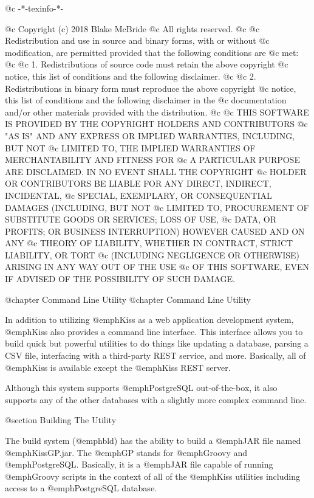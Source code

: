 @c -*-texinfo-*-

@c  Copyright (c) 2018 Blake McBride
@c  All rights reserved.
@c
@c  Redistribution and use in source and binary forms, with or without
@c  modification, are permitted provided that the following conditions are
@c  met:
@c
@c  1. Redistributions of source code must retain the above copyright
@c  notice, this list of conditions and the following disclaimer.
@c
@c  2. Redistributions in binary form must reproduce the above copyright
@c  notice, this list of conditions and the following disclaimer in the
@c  documentation and/or other materials provided with the distribution.
@c
@c  THIS SOFTWARE IS PROVIDED BY THE COPYRIGHT HOLDERS AND CONTRIBUTORS
@c  "AS IS" AND ANY EXPRESS OR IMPLIED WARRANTIES, INCLUDING, BUT NOT
@c  LIMITED TO, THE IMPLIED WARRANTIES OF MERCHANTABILITY AND FITNESS FOR
@c  A PARTICULAR PURPOSE ARE DISCLAIMED. IN NO EVENT SHALL THE COPYRIGHT
@c  HOLDER OR CONTRIBUTORS BE LIABLE FOR ANY DIRECT, INDIRECT, INCIDENTAL,
@c  SPECIAL, EXEMPLARY, OR CONSEQUENTIAL DAMAGES (INCLUDING, BUT NOT
@c  LIMITED TO, PROCUREMENT OF SUBSTITUTE GOODS OR SERVICES; LOSS OF USE,
@c  DATA, OR PROFITS; OR BUSINESS INTERRUPTION) HOWEVER CAUSED AND ON ANY
@c  THEORY OF LIABILITY, WHETHER IN CONTRACT, STRICT LIABILITY, OR TORT
@c  (INCLUDING NEGLIGENCE OR OTHERWISE) ARISING IN ANY WAY OUT OF THE USE
@c  OF THIS SOFTWARE, EVEN IF ADVISED OF THE POSSIBILITY OF SUCH DAMAGE.

@chapter Command Line Utility
@chapter Command Line Utility

In addition to utilizing @emph{Kiss} as a web application development
system, @emph{Kiss} also provides a command line interface.  This interface
allows you to build quick but powerful utilities to do things like updating
a database, parsing a CSV file, interfacing with a third-party REST service,
and more.  Basically, all of @emph{Kiss} is available except the @emph{Kiss}
REST server.

Although this system supports @emph{PostgreSQL} out-of-the-box, it
also supports any of the other databases with a slightly more complex
command line.

@section Building The Utility

The build system (@emph{bld}) has the ability to build a @emph{JAR}
file named @emph{KissGP.jar}.  The @emph{GP} stands for @emph{Groovy}
and @emph{PostgreSQL}.  Basically, it is a @emph{JAR} file capable of
running @emph{Groovy} scripts in the context of all of the @emph{Kiss}
utilities including access to a @emph{PostgreSQL} database.

